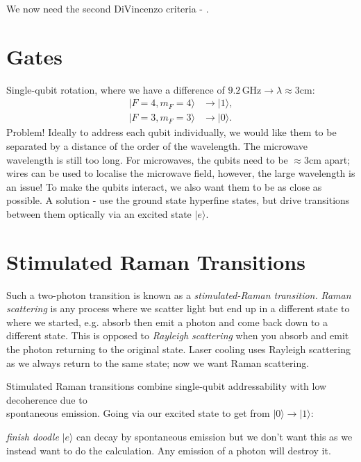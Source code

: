 \documentclass[lasers.tex]{subfiles}
\begin{document}
We now need the second DiVincenzo criteria - .

\section{Gates}
Single-qubit rotation, where we have a difference of $9.2\,$GHz$\to\lambda\approx3$cm:
\begin{align*}
    |F=4,m_F=4\rangle &\to |1\rangle, \\
    |F=3,m_F=3\rangle &\to |0\rangle.
\end{align*}
Problem! 
Ideally to address each qubit individually, we would like them to be separated by a distance of the order of the wavelength. 
The microwave wavelength is still too long. 
For microwaves, the qubits need to be $\approx3$cm apart; wires can be used to localise the microwave field, however, the large wavelength is an issue!
To make the qubits interact, we also want them to be as close as possible. 
A solution - use the ground state hyperfine states, but drive transitions between them optically via an excited state $|e\rangle$.

\section{Stimulated Raman Transitions}
Such a two-photon transition is known as a \emph{stimulated-Raman transition.}
\emph{Raman scattering} is any process where we scatter light but end up in a different state to where we started, e.g. absorb then emit a photon and come back down to a different state. 
This is opposed to \emph{Rayleigh scattering} when you absorb and emit the photon returning to the original state. 
Laser cooling uses Rayleigh scattering as we always return to the same state; now we want Raman scattering. 

Stimulated Raman transitions combine single-qubit addressability with low decoherence due to \\spontaneous emission. 
Going via our excited state to get from $|0\rangle\to|1\rangle$:
\begin{figure}[H]
    \centering
\end{figure}
\emph{finish doodle}
$|e\rangle$ can decay by spontaneous emission but we don't want this as we instead want to do the calculation. 
Any emission of a photon will destroy it. 
\end{document}
